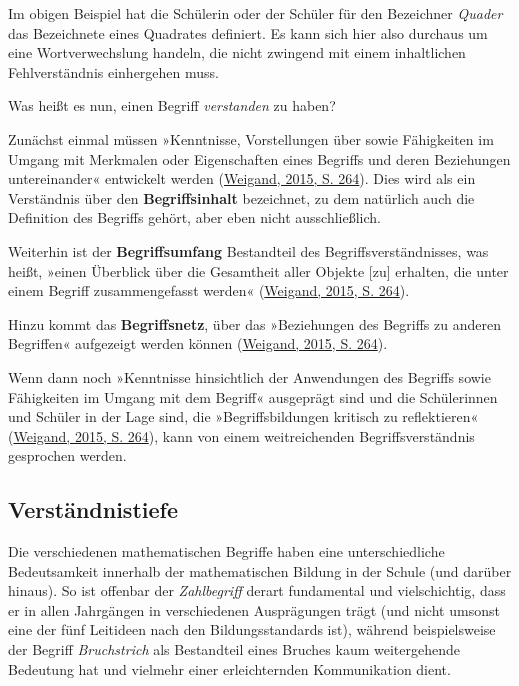 \documentclass[
  ngerman,
]{scrbook}
\theoremstyle{definition}
\theoremstyle{definition}
\theoremstyle{definition}
\theoremstyle{definition}
\theoremstyle{remark}
\begin{document}
Im obigen Beispiel hat die Schülerin oder der Schüler für den Bezeichner \emph{Quader} das Bezeichnete eines Quadrates definiert. Es kann sich hier also durchaus um eine Wortverwechslung handeln, die nicht zwingend mit einem inhaltlichen Fehlverständnis einhergehen muss.

Was heißt es nun, einen Begriff \emph{verstanden} zu haben?

Zunächst einmal müssen »Kenntnisse, Vorstellungen über sowie Fähigkeiten im Umgang mit Merkmalen oder Eigenschaften eines Begriffs und deren Beziehungen untereinander« entwickelt werden (\protect\hyperlink{ref-Weigand2015}{Weigand, 2015, S. 264}). Dies wird als ein Verständnis über den \textbf{Begriffsinhalt} bezeichnet, zu dem natürlich auch die Definition des Begriffs gehört, aber eben nicht ausschließlich.

Weiterhin ist der \textbf{Begriffsumfang} Bestandteil des Begriffsverständnisses, was heißt, »einen Überblick über die Gesamtheit aller Objekte {[}zu{]} erhalten, die unter einem Begriff zusammengefasst werden« (\protect\hyperlink{ref-Weigand2015}{Weigand, 2015, S. 264}).

Hinzu kommt das \textbf{Begriffsnetz}, über das »Beziehungen des Begriffs zu anderen Begriffen« aufgezeigt werden können (\protect\hyperlink{ref-Weigand2015}{Weigand, 2015, S. 264}).

Wenn dann noch »Kenntnisse hinsichtlich der Anwendungen des Begriffs sowie Fähigkeiten im Umgang mit dem Begriff« ausgeprägt sind und die Schülerinnen und Schüler in der Lage sind, die »Begriffsbildungen kritisch zu reflektieren« (\protect\hyperlink{ref-Weigand2015}{Weigand, 2015, S. 264}), kann von einem weitreichenden Begriffsverständnis gesprochen werden.

\hypertarget{verstuxe4ndnistiefe}{%
\subsection{Verständnistiefe}\label{verstuxe4ndnistiefe}}

Die verschiedenen mathematischen Begriffe haben eine unterschiedliche Bedeutsamkeit innerhalb der mathematischen Bildung in der Schule (und darüber hinaus). So ist offenbar der \emph{Zahlbegriff} derart fundamental und vielschichtig, dass er in allen Jahrgängen in verschiedenen Ausprägungen trägt (und nicht umsonst eine der fünf Leitideen nach den Bildungsstandards ist), während beispielsweise der Begriff \emph{Bruchstrich} als Bestandteil eines Bruches kaum weitergehende Bedeutung hat und vielmehr einer erleichternden Kommunikation dient.
\end{document}
